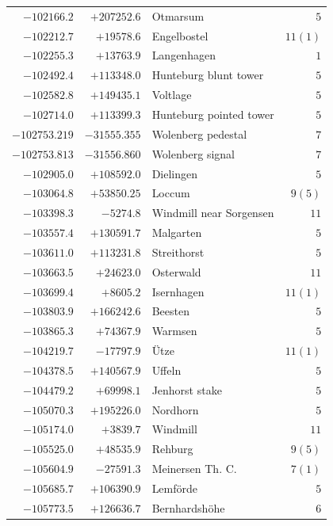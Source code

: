 \begin{center}
\begin{tabular}{r|r|p{170pt}|r}
\(-102166.2\)&\(+207252.6\)&Otmarsum&\(5\)\\
\(-102212.7\)&\(+19578.6\)&Engelbostel&\(11 (1)\)\\
\(-102255.3\)&\(+13763.9\)&Langenhagen&\(1\)\\
\(-102492.4\)&\(+113348.0\)&Hunteburg blunt tower&\(5\)\\
\(-102582.8\)&\(+149435.1\)&Voltlage&\(5\)\\
\(-102714.0\)&\(+113399.3\)&Hunteburg pointed tower&\(5\)\\
\(-102753.219\)&\(-31555.355\)&Wolenberg pedestal&\(7\)\\
\(-102753.813\)&\(-31556.860\)&Wolenberg signal&\(7\)\\
\(-102905.0\)&\(+108592.0\)&Dielingen&\(5\)\\
\(-103064.8\)&\(+53850.25\)&Loccum&\(9 (5)\)\\
\(-103398.3\)&\(-5274.8\)&Windmill near Sorgensen&\(11\)\\
\(-103557.4\)&\(+130591.7\)&Malgarten&\(5\)\\
\(-103611.0\)&\(+113231.8\)&Streithorst&\(5\)\\
\(-103663.5\)&\(+24623.0\)&Osterwald&\(11\)\\
\(-103699.4\)&\(+8605.2\)&Isernhagen&\(11 (1)\)\\
\(-103803.9\)&\(+166242.6\)&Beesten&\(5\)\\
\(-103865.3\)&\(+74367.9\)&Warmsen&\(5\)\\
\(-104219.7\)&\(-17797.9\)&Ütze&\(11 (1)\)\\
\(-104378.5\)&\(+140567.9\)&Uffeln&\(5\)\\
\(-104479.2\)&\(+69998.1\)&Jenhorst stake&\(5\)\\
\(-105070.3\)&\(+195226.0\)&Nordhorn&\(5\)\\
\(-105174.0\)&\(+3839.7\)&Windmill&\(11\)\\
\(-105525.0\)&\(+48535.9\)&Rehburg&\(9 (5)\)\\
\(-105604.9\)&\(-27591.3\)&Meinersen Th. C.&\(7 (1)\)\\
\(-105685.7\)&\(+106390.9\)&Lemförde&\(5\)\\
\(-105773.5\)&\(+126636.7\)&Bernhardshöhe&\(6\)\\
\hline\end{tabular}\endgroup\end{center}
\clearpage
